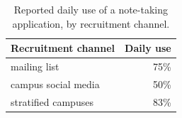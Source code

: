 \begin{table}[htbp]
\centering
\caption{Reported daily use of a note-taking application, by recruitment channel.}
\label{tab:daily-use-by-channel}
\begin{tabular}{lr}
\toprule
Recruitment channel & Daily use \\
\midrule
mailing list & 75\% \\
campus social media & 50\% \\
stratified campuses & 83\% \\
\bottomrule
\end{tabular}
\end{table}
